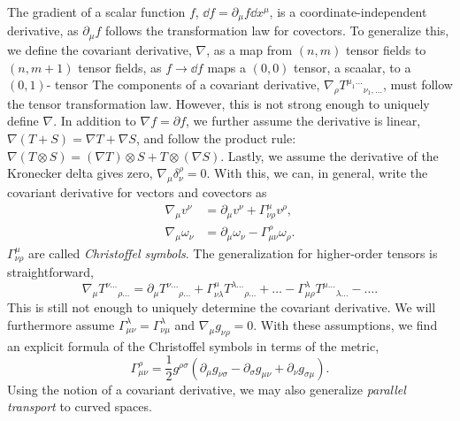 The gradient of a scalar function $f$, $\dd f = \partial_\mu f \dd x^\mu$, is a coordinate-independent derivative, as $\partial_\mu f$ follows the transformation law for covectors.
To generalize this, we define the covariant derivative, $\nabla$, as a map from $(n, m)$ tensor fields to $(n, m+1)$ tensor fields, as $f\rightarrow\dd f$ maps a $(0,0)$ tensor, a scaalar, to a $(0,1)$- tensor
The components of a covariant derivative, $\nabla_\rho T^{\mu_1\dots}{}_{\nu_1, \dots}$, must follow the tensor transformation law. 
However, this is not strong enough to uniquely define $\nabla$.
In addition to $\nabla f = \partial f$, we further assume the derivative is linear, $\nabla (T + S) = \nabla T + \nabla S$, and follow the product rule: $\nabla (T \otimes S) = (\nabla T)\otimes S + T \otimes (\nabla S)$.
Lastly, we assume the derivative of the Kronecker delta gives zero, $\nabla_\mu \delta^\rho_\nu = 0$.
With this, we can, in general, write the covariant derivative for vectors and covectors as~\autocite{carrollSpacetimeGeometryIntroduction2019}
%
\begin{align}
    \label{covariant derivative diff geom}
    \nabla_\mu v^\nu &= \partial_\mu v^\nu + \Gamma^\mu_{\nu \rho} v^\rho, \\
    \label{covariant derivative diff geom covector}
    \nabla_\mu \omega_\nu &= \partial_\mu \omega_\nu - \Gamma^\rho_{\mu \nu} \omega_\rho.
\end{align}
%
$\Gamma^{\mu}_{\nu \rho}$ are called \emph{Christoffel symbols}.
The generalization for higher-order tensors is straightforward, 
%
\begin{equation}
    \nabla_\mu T^{\nu\dots}{}_{\rho\dots}
    =
    \partial_\mu T^{\nu\dots}{}_{\rho\dots}
    + \Gamma^\mu_{\nu \lambda} T^{\lambda\dots}{}_{\rho\dots} +\dots
    - \Gamma^\lambda_{\mu \rho} T^{\mu\dots}{}_{\lambda\dots} -\dots.
\end{equation} 
%
This is still not enough to uniquely determine the covariant derivative.
We will furthermore assume $\Gamma^{\lambda}_{\mu \nu} = \Gamma^{\lambda}_{\nu \mu}$ and $\nabla_\mu g_{\nu \rho} = 0$.
With these assumptions, we find an explicit formula of the Christoffel symbols in terms of the metric,
%
\begin{equation}
    \label{christoffel symbols from metric}
    \Gamma^\rho_{\mu \nu} = \frac{1}{2} g^{\rho \sigma} (\partial_\mu g_{\nu \sigma} - \partial_\sigma g_{\mu \nu} + \partial_{\nu}g_{\sigma \mu}).
\end{equation}
%
Using the notion of a covariant derivative, we may also generalize \emph{parallel transport} to curved spaces.
